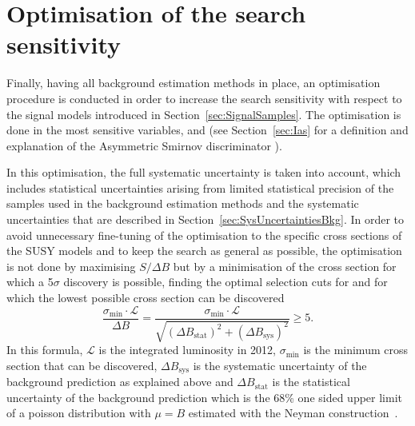 \chapter{Optimisation of the search sensitivity}
\label{sec:Optimisation}
Finally, having all background estimation methods in place, an optimisation procedure is conducted in order to increase the search sensitivity with respect to the signal models introduced in Section~\ref{sec:SignalSamples}.
The optimisation is done in the most sensitive variables, \pt and \ias (see Section~\ref{sec:Ias} for a definition and explanation of the Asymmetric Smirnov discriminator \ias).

In this optimisation, the full systematic uncertainty is taken into account, which includes statistical uncertainties arising from limited statistical precision of the samples used in the background estimation methods and the systematic uncertainties that are described in Section~\ref{sec:SysUncertaintiesBkg}.
In order to avoid unnecessary fine-tuning of the optimisation to the specific cross sections of the SUSY models and to keep the search as general as possible, 
the optimisation is not done by maximising  $S/\Delta B$ but by a minimisation of the cross section for which a 5$\sigma$ discovery is possible, \ie finding the optimal selection cuts for \pt and \ias for which the lowest possible cross section can be discovered
\begin{equation}
\label{eq:optimisation}
\frac{\sigma_{\text{min}}\cdot \mathcal{L}}{\Delta B} = \frac{\sigma_{\text{min}}\cdot \mathcal{L}}{\sqrt{ \left(\Delta B_{\text{stat}}\right)^2 + \left(\Delta B_{\text{sys}}\right)^2}} \geq 5.
\end{equation} 
In this formula, $\mathcal{L}$ is the integrated luminosity in 2012, $\sigma_{\text{min}}$ is the minimum cross section that can be discovered, $\Delta B_{\text{sys}}$ is the systematic uncertainty of the background prediction as explained above and 
$\Delta B_{\text{stat}}$ is the statistical uncertainty of the background prediction which is the 68\% one sided upper limit of a poisson distribution with $\mu = B$ estimated with the 
Neyman construction~\cite{bib:Neyman_1937,bib:PDG_2014}.\\

